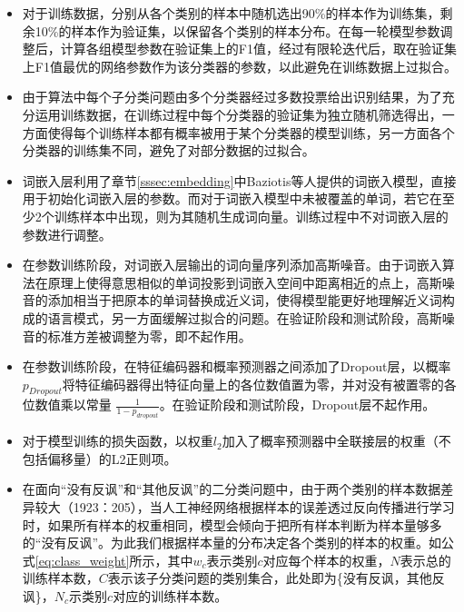 \begin{itemize}

\item 对于训练数据，分别从各个类别的样本中随机选出90\%的样本作为训练集，剩余10\%的样本作为验证集，以保留各个类别的样本分布。在每一轮模型参数调整后，计算各组模型参数在验证集上的F1值，经过有限轮迭代后，取在验证集上F1值最优的网络参数作为该分类器的参数，以此避免在训练数据上过拟合。

\item 由于算法中每个子分类问题由多个分类器经过多数投票给出识别结果，为了充分运用训练数据，在训练过程中每个分类器的验证集为独立随机筛选得出，一方面使得每个训练样本都有概率被用于某个分类器的模型训练，另一方面各个分类器的训练集不同，避免了对部分数据的过拟合。

\item 词嵌入层利用了章节\ref{sssec:embedding}中Baziotis等人\cite{baziotis2018ntua}提供的词嵌入模型，直接用于初始化词嵌入层的参数。而对于词嵌入模型中未被覆盖的单词，若它在至少2个训练样本中出现，则为其随机生成词向量。训练过程中不对词嵌入层的参数进行调整。

\item 在参数训练阶段，对词嵌入层输出的词向量序列添加高斯噪音。由于词嵌入算法在原理上使得意思相似的单词投影到词嵌入空间中距离相近的点上，高斯噪音的添加相当于把原本的单词替换成近义词，使得模型能更好地理解近义词构成的语言模式，另一方面缓解过拟合的问题。在验证阶段和测试阶段，高斯噪音的标准方差被调整为零，即不起作用。

\item 在参数训练阶段，在特征编码器和概率预测器之间添加了Dropout层，以概率$p_{Dropout}$将特征编码器得出特征向量上的各位数值置为零，并对没有被置零的各位数值乘以常量 $\frac{1}{1-p_{dropout}}$。在验证阶段和测试阶段，Dropout层不起作用。

\item 对于模型训练的损失函数，以权重$l_2$加入了概率预测器中全联接层的权重（不包括偏移量）的L2正则项。

\item 在面向“没有反讽”和“其他反讽”的二分类问题中，由于两个类别的样本数据差异较大（1923：205），当人工神经网络根据样本的误差透过反向传播进行学习时，如果所有样本的权重相同，模型会倾向于把所有样本判断为样本量够多的“没有反讽”。为此我们根据样本量的分布决定各个类别的样本的权重。如公式\ref{eq:class_weight}所示，其中$w_c$表示类别$c$对应每个样本的权重，$N$表示总的训练样本数，$C$表示该子分类问题的类别集合，此处即为\{没有反讽，其他反讽\}，$N_c$示类别$c$对应的训练样本数。

\end{itemize}

